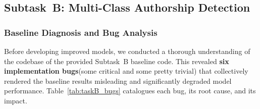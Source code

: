 \documentclass[11pt]{article}
\begin{document}



\subsection{Subtask~B: Multi-Class Authorship Detection}

\subsubsection{Baseline Diagnosis and Bug Analysis}
\label{sec:taskB_diagnosis}

Before developing improved models, we conducted a thorough understanding of the codebase of the provided Subtask~B baseline code. This revealed \textbf{six implementation bugs}(some critical and some pretty trivial) that collectively rendered the baseline results misleading and significantly degraded model performance. Table~\ref{tab:taskB_bugs} catalogues each bug, its root cause, and its impact.
\end{document}
